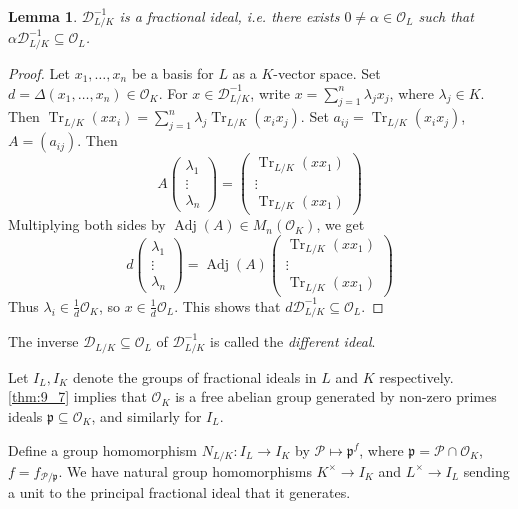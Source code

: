 \documentclass[11pt]{article}
\theoremstyle{definition}
\theoremstyle{plain}
\newtheorem{lemma}[definition]{Lemma}
\theoremstyle{remark}
\DeclareMathOperator{\Adj}{Adj}
\DeclareMathOperator{\Tr}{Tr}
\newcommand{\cD}{\mathcal{D}}
\newcommand{\cO}{\mathcal{O}}
\newcommand{\cP}{\mathcal{P}}
\newcommand{\fp}{\mathfrak{p}}
\begin{document}
\begin{lemma}\label{lem:12_6}
    $\cD_{L/K}^{-1}$ is a fractional ideal, i.e. there exists $0 \neq \alpha \in \cO_L$ such that $\alpha \cD_{L/K}^{-1} \subseteq \cO_L$.
\end{lemma}
\begin{proof}
    Let $x_1, \ldots, x_n$ be a basis for $L$ as a $K$-vector space. Set $d = \Delta(x_1, \ldots, x_n) \in \cO_K$. For $x \in \cD_{L/K}^{-1}$, write $x = \sum_{j=1}^n \lambda_j x_j$, where $\lambda_j \in K$. Then $\Tr_{L/K}(x x_i) = \sum_{j=1}^n \lambda_j \Tr_{L/K}(x_i x_j)$. Set $a_{ij} = \Tr_{L/K}(x_i x_j)$, $A = (a_{ij})$. Then
    \begin{equation*}
        A
        \begin{pmatrix} \lambda_1 \\ \vdots \\ \lambda_n \end{pmatrix}
        =
        \begin{pmatrix} \Tr_{L/K}(x x_1) \\ \vdots \\ \Tr_{L/K}(x x_1) \end{pmatrix}
    \end{equation*}
    Multiplying both sides by $\Adj(A) \in M_n(\cO_K)$, we get
    \begin{equation*}
        d
        \begin{pmatrix} \lambda_1 \\ \vdots \\ \lambda_n \end{pmatrix}
        = \Adj(A)
        \begin{pmatrix} \Tr_{L/K}(x x_1) \\ \vdots \\ \Tr_{L/K}(x x_1) \end{pmatrix}
    \end{equation*}
    Thus $\lambda_i \in \frac{1}{d} \cO_K$, so $x \in \frac{1}{d} \cO_L$. This shows that $d \cD_{L/K}^{-1} \subseteq \cO_L$.
\end{proof}

The inverse $\cD_{L/K} \subseteq \cO_L$ of $\cD_{L/K}^{-1}$ is called the \emph{different ideal}.

Let $I_L, I_K$ denote the groups of fractional ideals in $L$ and $K$ respectively. \autoref{thm:9_7} implies that $\cO_K$ is a free abelian group generated by non-zero primes ideals $\fp \subseteq \cO_K$, and similarly for $I_L$.

Define a group homomorphism $N_{L/K} : I_L \to I_K$ by $\cP \mapsto \fp^f$, where $\fp = \cP \cap \cO_K$, $f = f_{\cP / \fp}$. We have natural group homomorphisms $K^\times \to I_K$ and $L^\times \to I_L$ sending a unit to the principal fractional ideal that it generates.
\end{document}
